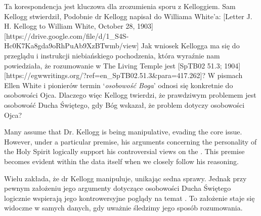 Ta korespondencja jest kluczowa dla zrozumienia sporu z Kelloggiem. Sam Kellogg stwierdził,  Podobnie dr Kellogg napisał do Williama White'a: [Letter J. H. Kellogg to William White, October 28, 1903][https://drive.google.com/file/d/1\_S4S-Hc0K7Ka8gda9oRhPuAb9XzBTwmb/view] Jak wniosek Kellogga ma się do przeglądu i instrukcji niebiańskiego pochodzenia, która wyraźnie nam powiedziała, że rozumowanie w The Living Temple jest [SpTB02 51.3; 1904][https://egwwritings.org/?ref=en\_SpTB02.51.3&para=417.262]? W pismach Ellen White i pionierów termin ‘\textit{osobowość Boga}’ odnosi się konkretnie do osobowości Ojca. Dlaczego więc Kellogg twierdzi, że prawdziwym problemem jest osobowość Ducha Świętego, gdy Bóg wskazał, że problem dotyczy osobowości Ojca?


Many assume that Dr. Kellogg is being manipulative, evading the core issue. However, under a particular premise, his arguments concerning the personality of the Holy Spirit logically support his controversial views on the . This premise becomes evident within the data itself when we closely follow his reasoning.


Wielu zakłada, że dr Kellogg manipuluje, unikając sedna sprawy. Jednak przy pewnym założeniu jego argumenty dotyczące osobowości Ducha Świętego logicznie wspierają jego kontrowersyjne poglądy na temat . To założenie staje się widoczne w samych danych, gdy uważnie śledzimy jego sposób rozumowania.

